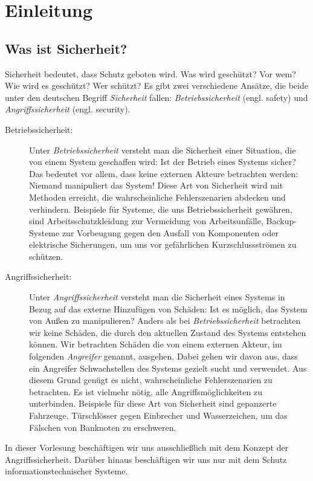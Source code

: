 \chapter{Einleitung}
\label{cha:intro}

\section{Was ist Sicherheit?}
Sicherheit bedeutet, dass Schutz geboten wird. Was wird geschützt? Vor
wem? Wie wird es geschützt? Wer schützt? Es gibt zwei verschiedene
Ansätze, die beide unter den deutschen Begriff \emph{Sicherheit} fallen:
\emph{Betriebssicherheit} (engl. safety) und \emph{Angriffssicherheit}
(engl. security).
\begin{description}
\item[Betriebssicherheit:] Unter \emph{Betriebssicherheit}
  versteht man die Sicherheit einer Situation, die von einem System
  geschaffen wird: Ist der Betrieb eines Systems sicher? Das bedeutet vor
  allem, dass keine externen Akteure betrachten werden: Niemand
  manipuliert das System! Diese Art von Sicherheit wird mit Methoden
  erreicht, die wahrscheinliche Fehlerszenarien abdecken und
  verhindern. Beispiele für Systeme, die uns Betriebssicherheit gewähren,
  sind Arbeitsschutzkleidung zur Vermeidung von Arbeitsunfälle,
  Backup-Systeme zur Vorbeugung gegen den Ausfall von Komponenten oder
  elektrische Sicherungen, um uns vor gefährlichen Kurzschlussströmen zu
  schützen.
\item[Angriffssicherheit:] Unter \emph{Angriffssicherheit}
  versteht man die Sicherheit eines Systems in Bezug auf das externe
  Hinzufügen von Schäden: Ist es möglich, das System von Außen zu
  manipulieren? Anders als bei \emph{Betriebssicherheit} betrachten wir
  keine Schäden, die durch den aktuellen Zustand des Systems entstehen
  können. Wir betrachten Schäden die von einem externen Akteur, im
  folgenden \emph{Angreifer} genannt, ausgehen. Dabei gehen wir davon aus,
  dass ein Angreifer Schwachstellen des Systems gezielt sucht und
  verwendet. Aus diesem Grund genügt es nicht, wahrscheinliche
  Fehlerszenarien zu betrachten. Es ist vielmehr nötig, alle
  Angriffsmöglichkeiten zu unterbinden. Beispiele für diese Art von
  Sicherheit sind gepanzerte Fahrzeuge, Türschlösser gegen Einbrecher und
  Wasserzeichen, um das Fälschen von Banknoten zu erschweren.
\end{description} 
In dieser Vorlesung beschäftigen wir uns
ausschließlich mit dem Konzept der Angriffssicherheit. Darüber hinaus
beschäftigen wir uns nur mit dem Schutz informationstechnischer Systeme.

